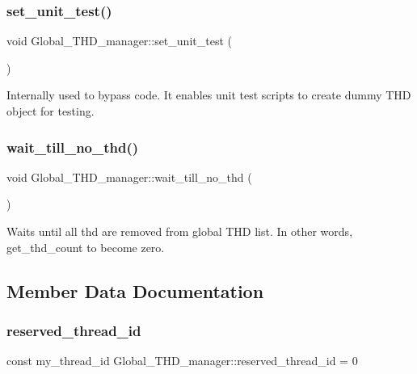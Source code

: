 \subsubsection{\texorpdfstring{set\+\_\+unit\+\_\+test()}{set\_unit\_test()}}
{\footnotesize\ttfamily void Global\+\_\+\+T\+H\+D\+\_\+manager\+::set\+\_\+unit\+\_\+test (\begin{DoxyParamCaption}{ }\end{DoxyParamCaption})\hspace{0.3cm}{\ttfamily [inline]}}

Internally used to bypass code. It enables unit test scripts to create dummy T\+HD object for testing. \mbox{\label{classGlobal__THD__manager_ac52a7fd63b6042da22b9f0126e1a51eb}} 
\subsubsection{\texorpdfstring{wait\+\_\+till\+\_\+no\+\_\+thd()}{wait\_till\_no\_thd()}}
{\footnotesize\ttfamily void Global\+\_\+\+T\+H\+D\+\_\+manager\+::wait\+\_\+till\+\_\+no\+\_\+thd (\begin{DoxyParamCaption}{ }\end{DoxyParamCaption})}

Waits until all thd are removed from global T\+HD list. In other words, get\+\_\+thd\+\_\+count to become zero. 

\subsection{Member Data Documentation}
\mbox{\label{classGlobal__THD__manager_a7306fb4d252fca9c53df1b427ba3096b}} 
\subsubsection{\texorpdfstring{reserved\+\_\+thread\+\_\+id}{reserved\_thread\_id}}
{\footnotesize\ttfamily const my\+\_\+thread\+\_\+id Global\+\_\+\+T\+H\+D\+\_\+manager\+::reserved\+\_\+thread\+\_\+id = 0\hspace{0.3cm}{\ttfamily [static]}}

